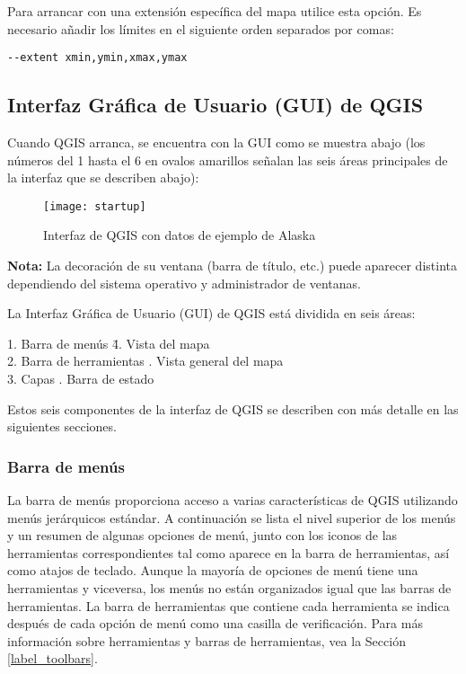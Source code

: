 Para arrancar con una extensión específica del mapa utilice esta opción. Es necesario
añadir los límites en el siguiente orden separados por comas:
\begin{verbatim}
--extent xmin,ymin,xmax,ymax
\end{verbatim}


\subsection{Interfaz Gráfica de Usuario (GUI) de QGIS}
\label{label_qgismainwindow}

Cuando QGIS arranca, se encuentra con la GUI como se muestra abajo
(los números del 1 hasta el 6 en ovalos amarillos señalan las seis áreas principales 
de la interfaz que se describen abajo):

\begin{figure}[ht]
   \begin{center}
   \caption{Interfaz de QGIS con datos de ejemplo de Alaska \nixcaption}
	 \label{fig:startup}
   \texttt{[image: startup]}
\end{center} 
\end{figure}

\textbf{Nota:} La decoración de su ventana (barra de título, etc.) puede aparecer 
distinta dependiendo del sistema operativo y administrador de ventanas.

La Interfaz Gráfica de Usuario (GUI) de QGIS está dividida en seis áreas:

\begin{tabbing}
1. Barra de menús \hspace{3cm}\= 4. Vista del mapa \\
2. Barra de herramientas \hspace{3cm}. Vista general del mapa \\
3. Capas \hspace{3cm}. Barra de estado   
\end{tabbing}

Estos seis componentes de la interfaz de QGIS se describen con más detalle
en las siguientes secciones.

\subsubsection{Barra de menús}\label{label_menubar}

La barra de menús proporciona acceso a varias características de QGIS utilizando 
menús jerárquicos estándar. A continuación se lista el nivel superior de los menús
y un resumen de algunas opciones de menú, junto con los iconos de las herramientas
correspondientes tal como aparece en la barra de herramientas, así como atajos de
teclado. Aunque la mayoría de opciones de menú tiene una herramientas y viceversa,
los menús no están organizados igual que las barras de herramientas. La barra de
herramientas que contiene cada herramienta se indica después de cada opción de menú
como una casilla de verificación. Para más información sobre herramientas y barras
de herramientas, vea la Sección \ref{label_toolbars}.

